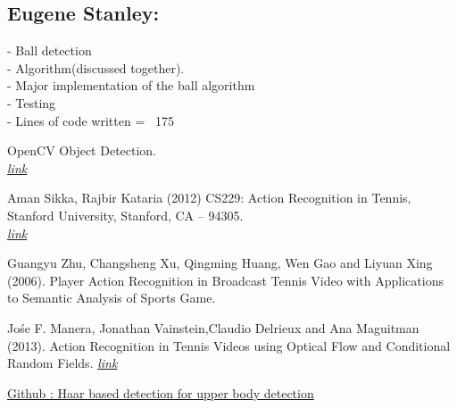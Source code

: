 \documentclass[10.5pt]{proc}
\begin{document}
	\subsection{Eugene Stanley:}
	- Ball detection\\
	- Algorithm(discussed together).\\
	- Major implementation of the ball algorithm\\
	- Testing\\
	- Lines of code written = ~175\\
	
	\newpage
\begin{thebibliography}{99}
	
OpenCV Object Detection. \\
\href{http://docs.opencv.org/modules/gpu/doc/object\_detection.html}{\emph{link}}

Aman Sikka, Rajbir Kataria (2012) CS229: Action Recognition in Tennis, Stanford University, Stanford, CA -- 94305.\\
\href{http://cs229.stanford.edu/proj2012/KatariaSikka-ActionRecognitionInTennis.pdf}{\emph{link}}

Guangyu Zhu, Changsheng Xu, Qingming Huang, Wen Gao and Liyuan Xing (2006). Player Action Recognition in Broadcast Tennis Video with Applications to Semantic Analysis of Sports Game. 

Jo\'se F. Manera, Jonathan Vainstein,Claudio Delrieux and Ana Maguitman (2013). Action Recognition in Tennis Videos using Optical Flow and Conditional Random Fields.
\href{http://42jaiio.sadio.org.ar/proceedings/simposios/Trabajos/AST/14.pdf}{\emph{link}}


\href{https://github.com/Itseez/opencv/blob/master/data/haarcascades/haarcascade_upperbody.xml}{Github : Haar based detection for upper body detection}




\end{thebibliography}
\end{document}
